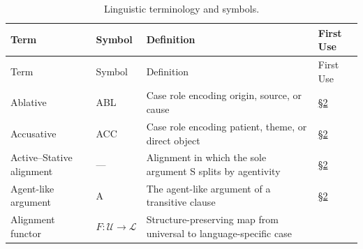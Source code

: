 \documentclass[
]{article}
\begin{document}
\begin{longtable}[]{@{}
  >{\raggedright\arraybackslash}p{}
  >{\centering\arraybackslash}p{}
  >{\raggedright\arraybackslash}p{}
  >{\centering\arraybackslash}p{}@{}}
\caption{Linguistic terminology and
symbols.}\label{tbl:not-linguistic}\tabularnewline
\toprule\noalign{}
\begin{minipage}[b]{\linewidth}\raggedright
Term
\end{minipage} & \begin{minipage}[b]{\linewidth}\centering
Symbol
\end{minipage} & \begin{minipage}[b]{\linewidth}\raggedright
Definition
\end{minipage} & \begin{minipage}[b]{\linewidth}\centering
First Use
\end{minipage} \\
\midrule\noalign{}
\endfirsthead
\toprule\noalign{}
\begin{minipage}[b]{\linewidth}\raggedright
Term
\end{minipage} & \begin{minipage}[b]{\linewidth}\centering
Symbol
\end{minipage} & \begin{minipage}[b]{\linewidth}\raggedright
Definition
\end{minipage} & \begin{minipage}[b]{\linewidth}\centering
First Use
\end{minipage} \\
\midrule\noalign{}
\endhead
\bottomrule\noalign{}
\endlastfoot
Ablative & ABL & Case role encoding origin, source, or cause &
\href{02_case_systems.md\#sec:case-systems}{§2} \\
Accusative & ACC & Case role encoding patient, theme, or direct object &
\href{02_case_systems.md\#sec:case-systems}{§2} \\
Active--Stative alignment & --- & Alignment in which the sole argument S
splits by agentivity &
\href{02_case_systems.md\#sec:case-systems}{§2} \\
Agent-like argument & A & The agent-like argument of a transitive clause
& \href{02_case_systems.md\#sec:case-systems}{§2} \\
Alignment functor & \(F: \mathcal{U} \to \mathcal{L}\) &
Structure-preserving map from universal to language-specific case

\end{longtable}
\end{document}
